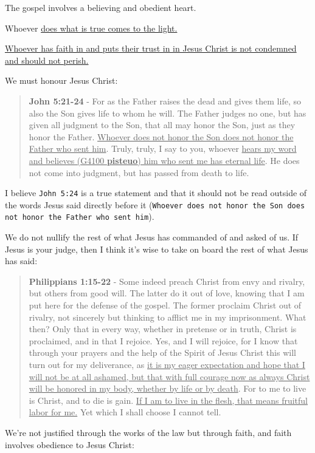 \documentclass[11pt]{article}
\begin{document}
The gospel involves a believing and obedient heart.

Whoever \uline{does what is true comes to the light.}

\uline{Whoever has faith in and puts their trust in in Jesus Christ is not condemned and should not perish.}

We must honour Jesus Christ:

\begin{quote}
\textbf{John 5:21-24} - For as the Father raises the dead and gives them life, so also the Son gives life to whom he will. The Father judges no one, but has given all judgment to the Son, that all may honor the Son, just as they honor the Father. \uline{Whoever does not honor the Son does not honor the Father who sent him}. Truly, truly, I say to you, whoever \uline{hears my word and believes (G4100 \textbf{pisteuo}) him who sent me has eternal life}. He does not come into judgment, but has passed from death to life.
\end{quote}

I believe \texttt{John 5:24} is a true statement and that it should not be read outside of the words Jesus said directly before it (\texttt{Whoever does not honor the Son does not honor the Father who sent him}).

We do not nullify the rest of what Jesus has commanded of and asked of us. If Jesus is your judge, then I think it's wise to take on board the rest of what Jesus has said:

\begin{quote}
\textbf{Philippians 1:15-22} - Some indeed preach Christ from envy and rivalry, but others from good will. The latter do it out of love, knowing that I am put here for the defense of the gospel. The former proclaim Christ out of rivalry, not sincerely but thinking to afflict me in my imprisonment. What then? Only that in every way, whether in pretense or in truth, Christ is proclaimed, and in that I rejoice. Yes, and I will rejoice, for I know that through your prayers and the help of the Spirit of Jesus Christ this will turn out for my deliverance, as \uline{it is my eager expectation and hope that I will not be at all ashamed, but that with full courage now as always Christ will be honored in my body, whether by life or by death}. For to me to live is Christ, and to die is gain. \uline{If I am to live in the flesh, that means fruitful labor for me.} Yet which I shall choose I cannot tell.
\end{quote}

We're not justified through the works of the law but through faith, and faith involves obedience to Jesus Christ:
\end{document}
